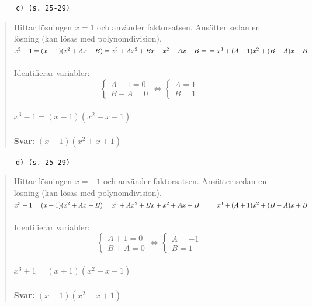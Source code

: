 \documentclass[a4paper]{article}
\newcommand{\tskcol}[1]{\textcolor{tskcol}{#1}}
\begin{document}
	\texttt{\tskcol{~~~~~~c) (s. 25-29)}}
	\begin{quotation}
		\noindent
		Hittar lösningen $x=1$ och använder faktorsatsen. Ansätter sedan en lösning (kan lösas med polynomdivision). \\
		$x^3-1=(x-1)(x^2+Ax+B)=x^3+Ax^2+Bx-x^2-Ax-B= \\
		=x^3+(A-1)x^2+(B-A)x-B$ \\ \\
		Identifierar variabler: \\
		\[\begin{cases}
		A-1=0 \\
		B-A=0
		\end{cases}
		\Leftrightarrow
		\begin{cases}
		A=1 \\
		B=1
		\end{cases}\] \\
		$x^3-1=(x-1)(x^2+x+1)$
		\\ \\
		\textbf{Svar:} $(x-1)(x^2+x+1)$
	\end{quotation}
	
	\pagebreak
	\texttt{\tskcol{~~~~~~d) (s. 25-29)}}
	\begin{quotation}
		\noindent
		Hittar lösningen $x=-1$ och använder faktorsatsen. Ansätter sedan en lösning (kan lösas med polynomdivision). \\
		$x^3+1=(x+1)(x^2+Ax+B)=x^3+Ax^2+Bx+x^2+Ax+B= \\
		=x^3+(A+1)x^2+(B+A)x+B$ \\ \\
		Identifierar variabler: \\
		\[\begin{cases}
		A+1=0 \\
		B+A=0
		\end{cases}
		\Leftrightarrow
		\begin{cases}
		A=-1 \\
		B=1
		\end{cases}\] \\
		$x^3+1=(x+1)(x^2-x+1)$
		\\ \\
		\textbf{Svar:} $(x+1)(x^2-x+1)$
	\end{quotation}
	
\end{document}
